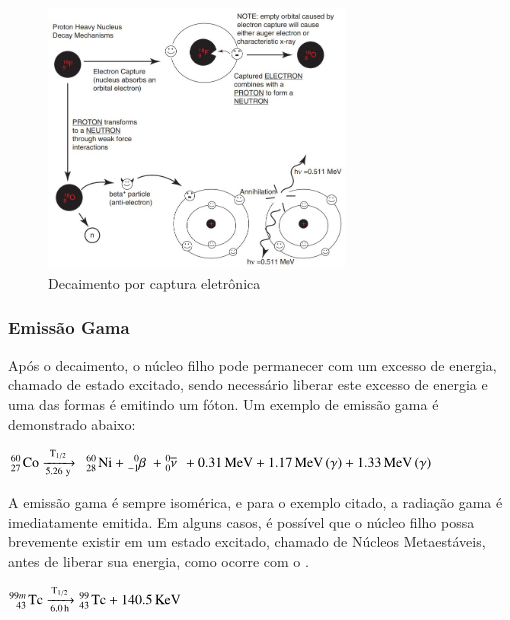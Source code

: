 \documentclass[11pt,a4paper]{article}
\newcounter{exemplo}
\begin{document}
                \begin{figure}[h]
                    \centering
                    \includegraphics[width=0.7\textwidth]{Imagens/decaimentoPorCapturaEletronica.jpg}
                    \caption{Decaimento por captura eletrônica}
                    \label{fig:decaimentoPorCapturaEletronica}
                \end{figure}

\subsubsection*{Emissão Gama}

    Após o decaimento, o núcleo filho pode permanecer com um excesso de energia, chamado de estado excitado, sendo necessário liberar este excesso de energia e uma das formas é emitindo um fóton. Um exemplo de emissão gama é demonstrado abaixo:

                \begin{center}
                    $\ce{^{60}_{27} Co  ->[{T_{1/2}}][{5.26 y}] \; ^{60}_{28} Ni + ^{0}_{-1}\beta \; + ^{0}_{0}\overline{\nu} \; + 0.31 MeV + 1.17 MeV (\gamma) + 1.33 MeV (\gamma)}$
                \end{center}
                
   A emissão gama é sempre isomérica, e para o exemplo citado, a radiação gama é imediatamente emitida. Em alguns casos, é possível que o núcleo filho possa brevemente existir em um estado excitado, chamado de Núcleos Metaestáveis, antes de liberar sua energia, como ocorre com o .

                \begin{center}
                    $\ce{^{99m}_{43} Tc ->[{T_{1/2}}][6.0 h] ^{99}_{43} Tc + 140.5 KeV}$
                \end{center}
            
\end{document}
